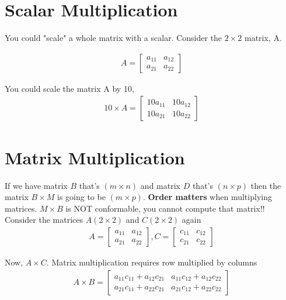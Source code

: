 \documentclass{article}
\begin{document}
\section{Scalar Multiplication}
You could "scale" a whole matrix with a scalar. Consider the $2 \times 2$ matrix, A. 

\begin{align}
    A = \begin{bmatrix}
            a_{11} & a_{12} \\
            a_{21} & a_{22}
        \end{bmatrix}
\end{align}

You could scale the matrix A by 10, 
\begin{align}
    10 \times A = \begin{bmatrix}
            10 a_{11} & 10 a_{12} \\
            10 a_{21} & 10 a_{22}
        \end{bmatrix}
\end{align}


\section{Matrix Multiplication}
If we have matrix $B$ that's $(m \times n)$ and matrix $D$ that's $(n \times p)$ then the matrix $B \times M$ is going to be $(m \times p)$. \textbf{Order matters} when multiplying matrices. $M \times B$ is NOT conformable, you cannot compute that matrix!! \\

Consider the matrices $A (2 \times 2)$  and $C (2 \times 2)$ again 
\begin{align}
    A = \begin{bmatrix}
            a_{11} & a_{12} \\
            a_{21} & a_{22}
        \end{bmatrix}, 
    C = \begin{bmatrix}
            c_{11} & c_{12} \\
            c_{21} & c_{22}
        \end{bmatrix}
\end{align}

Now,  $A \times C$. Matrix multiplication requires row multiplied by columns 
\begin{align}
    A \times B = \begin{bmatrix}
        a_{11} c_{11} + a_{12} c_{21}  & a_{11} c_{12} + a_{12} c_{22} \\
        a_{21} c_{11} + a_{22} c_{21}  & a_{21} c_{12} + a_{22} c_{22} 
    \end{bmatrix}
\end{align}
\end{document}
